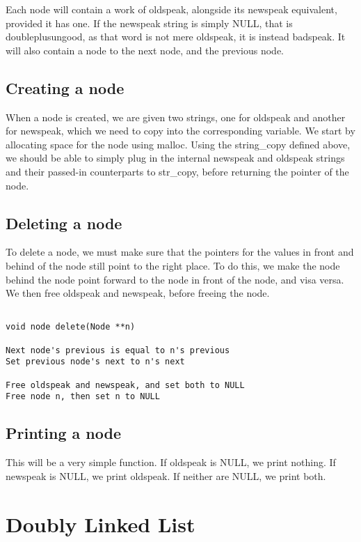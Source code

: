\documentclass[11pt]{article}
\begin{document}
Each node will contain a work of oldspeak, alongside its newspeak equivalent, provided it has one. If the newspeak string is simply NULL, that is doubleplusungood, as that word is not mere oldspeak, it is instead badspeak. It will also contain a node to the next node, and the previous node.

\subsection{Creating a node}

When a node is created, we are given two strings, one for oldspeak and another for newspeak, which we need to copy into the corresponding variable. We start by allocating space for the node using malloc. Using the string\_copy defined above, we should be able to simply plug in the internal newspeak and oldspeak strings and their passed-in counterparts to str\_copy, before returning the pointer of the node.

\subsection{Deleting a node}

To delete a node, we must make sure that the pointers for the values in front and behind of the node still point to the right place. To do this, we make the node behind the node point forward to the node in front of the node, and visa versa. We then free oldspeak and newspeak, before freeing the node.

\begin{verbatim}

void node delete(Node **n)

Next node's previous is equal to n's previous
Set previous node's next to n's next

Free oldspeak and newspeak, and set both to NULL
Free node n, then set n to NULL

\end{verbatim}

\subsection{Printing a node}

This will be a very simple function. If oldspeak is NULL, we print nothing. If newspeak is NULL, we print oldspeak. If neither are NULL, we print both.

\section{Doubly Linked List}
\end{document}
